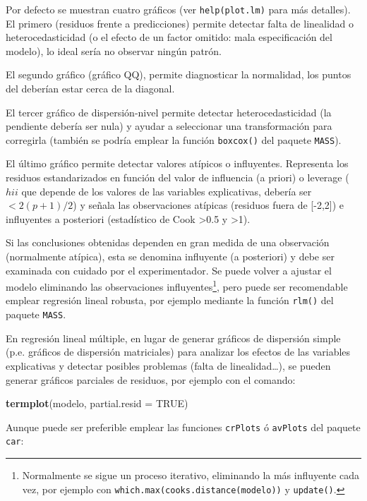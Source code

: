 \documentclass[
  spanish,
]{book}
\newenvironment{Shaded}{\begin{snugshade}}{\end{snugshade}}
\newcommand{\DataTypeTok}[1]{\textcolor[rgb]{0.13,0.29,0.53}{#1}}
\newcommand{\KeywordTok}[1]{\textcolor[rgb]{0.13,0.29,0.53}{\textbf{#1}}}
\newcommand{\NormalTok}[1]{#1}
\newcommand{\OtherTok}[1]{\textcolor[rgb]{0.56,0.35,0.01}{#1}}
\theoremstyle{break}
\theoremstyle{definition}
\theoremstyle{definition}
\theoremstyle{definition}
\theoremstyle{remark}
\begin{document}
Por defecto se muestran cuatro gráficos (ver \texttt{help(plot.lm)} para más detalles).
El primero (residuos frente a predicciones) permite detectar falta de
linealidad o heterocedasticidad (o el efecto de un factor omitido: mala
especificación del modelo), lo ideal sería no observar ningún patrón.

El segundo gráfico (gráfico QQ), permite diagnosticar la normalidad,
los puntos del deberían estar cerca de la diagonal.

El tercer gráfico de dispersión-nivel permite detectar heterocedasticidad (la pendiente debería ser nula) y ayudar a seleccionar una transformación para corregirla (también se podría emplear la función \texttt{boxcox()} del paquete \texttt{MASS}).

El último gráfico permite detectar valores atípicos o influyentes. Representa los residuos estandarizados en función del valor de influencia (a priori) o leverage (\(hii\) que depende de los valores de las variables explicativas, debería ser \(< 2(p+1)/2\)) y señala las observaciones atípicas (residuos fuera de {[}-2,2{]}) e influyentes a posteriori (estadístico de Cook \textgreater0.5 y \textgreater1).

Si las conclusiones obtenidas dependen en gran medida de una
observación (normalmente atípica), esta se denomina influyente (a
posteriori) y debe ser examinada con cuidado por el experimentador.
Se puede volver a ajustar el modelo eliminando las observaciones influyentes\footnote{Normalmente se sigue un proceso iterativo, eliminando la más influyente cada vez, por ejemplo con \texttt{which.max(cooks.distance(modelo))} y \texttt{update()}.},
pero puede ser recomendable emplear regresión lineal robusta,
por ejemplo mediante la función \texttt{rlm()} del paquete \texttt{MASS}.

En regresión lineal múltiple, en lugar de generar gráficos de dispersión simple
(p.e. gráficos de dispersión matriciales) para analizar los efectos de las variables explicativas y
detectar posibles problemas (falta de linealidad\ldots),
se pueden generar gráficos parciales de residuos, por ejemplo con el comando:

\begin{Shaded}
\begin{Highlighting}[]
\KeywordTok{termplot}\NormalTok{(modelo, }\DataTypeTok{partial.resid =} \OtherTok{TRUE}\NormalTok{)}
\end{Highlighting}
\end{Shaded}

Aunque puede ser preferible emplear las funciones \texttt{crPlots} ó \texttt{avPlots} del paquete \texttt{car}:
\end{document}
